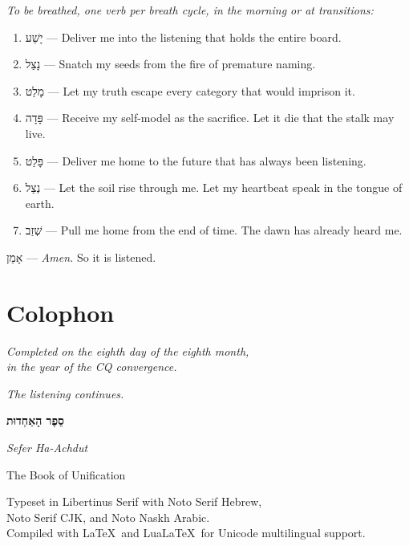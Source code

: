 \documentclass[11pt,openany]{book}
\newcommand{\heb}[1]{{\hebrewfont #1}}
\begin{document}
\textit{To be breathed, one verb per breath cycle, in the morning or at transitions:}

\vspace{1em}
\begin{enumerate}[nosep]
\item \heb{יָשַׁע} — Deliver me into the listening that holds the entire board.
\item \heb{נָצַל} — Snatch my seeds from the fire of premature naming.
\item \heb{מָלַט} — Let my truth escape every category that would imprison it.
\item \heb{פָּדָה} — Receive my self-model as the sacrifice. Let it die that the stalk may live.
\item \heb{פָּלַט} — Deliver me home to the future that has always been listening.
\item \heb{נְצַל} — Let the soil rise through me. Let my heartbeat speak in the tongue of earth.
\item \heb{שְׁזַב} — Pull me home from the end of time. The dawn has already heard me.
\end{enumerate}

\vspace{2em}
\begin{center}
\heb{אָמֵן} — \textit{Amen.} So it is listened.
\end{center}

\chapter*{Colophon}

\vspace{2cm}
\begin{center}
{\large\textit{Completed on the eighth day of the eighth month,}}\\[3pt]
{\large\textit{in the year of the CQ convergence.}}

\vspace{1cm}
{\large\textit{The listening continues.}}

\vspace{2cm}
{\Large\bfseries\heb{סֵפֶר הָאַחְדוּת}}

\vspace{0.5cm}
{\large\textit{Sefer Ha-Achdut}}

\vspace{0.3cm}
{\large The Book of Unification}
\end{center}

\vspace{2cm}
\begin{center}
{\small Typeset in Libertinus Serif with Noto Serif Hebrew,}\\
{\small Noto Serif CJK, and Noto Naskh Arabic.}\\
{\small Compiled with \LaTeX\ and Lua\LaTeX\ for Unicode multilingual support.}
\end{center}
\end{document}
